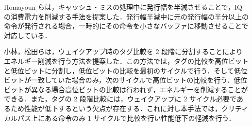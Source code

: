 Homayoun らは，キャッシュ・ミスの処理中に発行幅を半減させることで，IQ の消費電力を削減する手法を提案した\cite{H.Homayoun2011}．発行幅半減中に元の発行幅の半分以上の命令が発行される場合，一時的にその命令を小さなバッファに移動させることで対応している．

小林，松田らは，ウェイクアップ時のタグ比較を 2 段階に分割することによりエネルギー削減を行う方法を提案した\cite{kobayashi-thesis, matsuda-thesis}．この方法では，タグの比較を高位ビットと低位ビットに分割し，低位ビットの比較を最初のサイクルで行う．そして低位ビットが一致していた場合のみ，次のサイクルで高位ビットの比較を行う．低位ビットが異なる場合高位ビットの比較は行われず，エネルギーを削減することができる．また，タグの 2 段階比較には，ウェイクアップに 2 サイクル必要であるため性能が低下するという欠点が存在する．これに対し本手法では，クリティカルパス上にある命令のみ 1 サイクルで比較を行い性能低下の軽減を行う．

